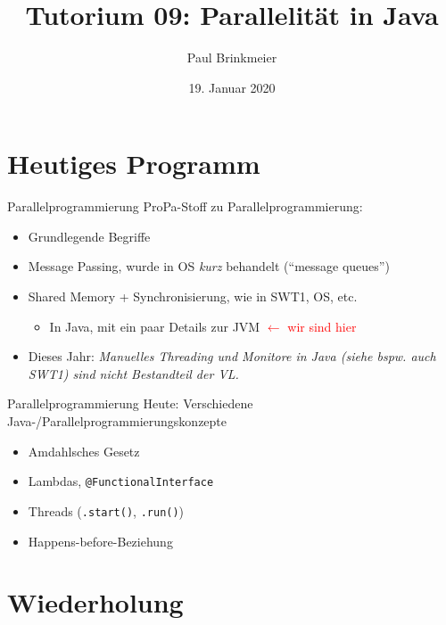 \documentclass{beamer}
\title{Tutorium 09: Parallelität in Java}
\author{Paul Brinkmeier}
\institute{Tutorium Programmierparadigmen am KIT}
\date{19. Januar 2020}
\begin{document}
\begin{frame}
	\titlepage
\end{frame}

\section{Heutiges Programm}

\begin{frame}{Parallelprogrammierung}
	ProPa-Stoff zu Parallelprogrammierung:

	\begin{itemize}
		\item Grundlegende Begriffe
		\item Message Passing, wurde in OS \emph{kurz} behandelt (\enquote{message queues})
		\item Shared Memory + Synchronisierung, wie in SWT1, OS, etc.
		\begin{itemize}
                  \item In Java, mit ein paar Details zur JVM \textcolor{red}{$\leftarrow$ wir sind hier}
		\end{itemize}
              \item Dieses Jahr: \emph{Manuelles Threading und Monitore in Java (siehe bspw. auch SWT1) sind nicht Bestandteil der VL.}
	\end{itemize}
\end{frame}

\begin{frame}{Parallelprogrammierung}
  Heute: Verschiedene Java-/Parallelprogrammierungskonzepte

  \begin{itemize}
    \item Amdahlsches Gesetz
    \item Lambdas, \texttt{@FunctionalInterface}
    \item Threads (\texttt{.start()}, \texttt{.run()})
    \item Happens-before-Beziehung
  \end{itemize}
\end{frame}

\section{Wiederholung}
\end{document}
